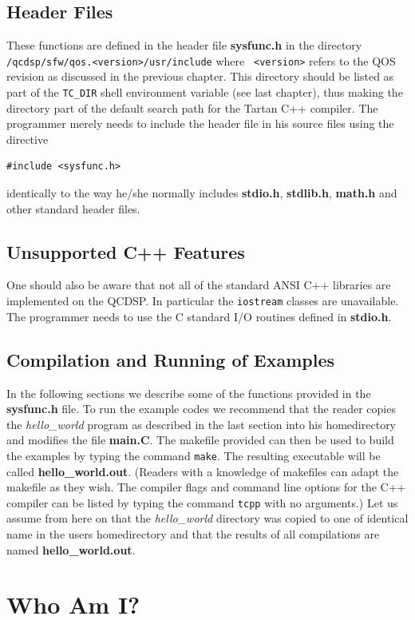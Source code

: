 \subsection{Header Files}
These functions are defined in the header file {\bf sysfunc.h} in the
directory {\tt /qcdsp/sfw/qos.<version>/usr/include} where {\tt
<version>} refers to the QOS revision as discussed in the previous
chapter. This directory should be listed as part of the {\tt TC\_DIR}
shell environment variable (see last chapter), thus making the
directory part of the default search path for the Tartan C++
compiler. The programmer merely needs to include the header file in
his source files using the directive
\begin{verbatim}
#include <sysfunc.h>
\end{verbatim} 
identically to the way he/she normally includes {\bf stdio.h}, {\bf stdlib.h}, 
{\bf math.h} and other standard header files.

\subsection{Unsupported C++ Features}
One should also be aware that not all of the standard ANSI C++ libraries
are implemented on the QCDSP. In particular the {\tt iostream} classes
are unavailable. The programmer needs to use the C standard I/O routines
defined in {\bf stdio.h}.

\subsection{Compilation and Running of Examples}
In the following sections we describe some of the functions provided 
in the {\bf sysfunc.h} file. To run the example codes we recommend that
the reader copies the {\em hello\_world} program as described in the last
section into his homedirectory and modifies the file {\bf main.C}. The makefile
provided can then be used to build the examples by typing the command {\tt make}. The resulting executable will be called {\bf hello\_world.out}. (Readers
with a knowledge of makefiles can adapt the makefile as they wish. The compiler
flags and command line options for the C++ compiler can be listed by typing
the command {\tt tcpp} with no arguments.) Let us
assume from here on that the {\em hello\_world} directory was copied to one
of identical name in the users homedirectory and that the results of all
compilations are named {\bf hello\_world.out}.

\section{Who Am I?}
